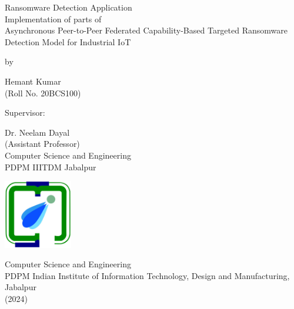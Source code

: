 \documentclass[12pt,twocolumn]{article}
\begin{document}
\begin{titlepage}
    \begin{center}
        \vspace*{1cm}
        
        {\LARGE Ransomware Detection Application} \\
        \Large{Implementation of parts of \\ {Asynchronous Peer-to-Peer Federated Capability-Based Targeted Ransomware Detection Model for Industrial IoT} }
        
        \vspace{0.6cm}
        
        \Large by
        
        {\Large Hemant Kumar} \\
        (Roll No. 20BCS100)
        
        \vspace{1cm}
        
        \Large Supervisor:
        
        {\Large Dr. Neelam Dayal }\\
            (Assistant Professor) \\
        Computer Science and Engineering \\
        PDPM IIITDM Jabalpur
        
        \vspace{1cm}
        
        
        
        \vfill
        
        \includegraphics[width=30mm]{logo_college copy.png}
        
        \vspace{0.5cm}
        
        \Large{Computer Science and Engineering 
        \\ PDPM Indian Institute of Information Technology, Design and Manufacturing, Jabalpur}
        \\ (2024)
        
    \end{center}
\end{titlepage}
\end{document}
